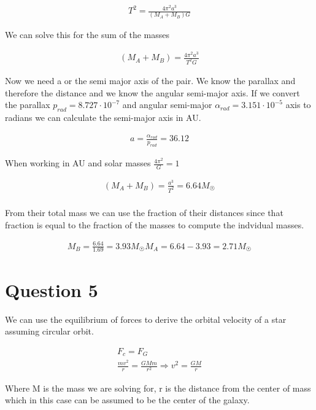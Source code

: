 \documentclass[a4paper]{article}
\begin{document}
\begin{align}
    T^2 = \frac{4\pi^2a^3}{(M_A+M_B)G}
\end{align}

We can solve this for the sum of the masses

\begin{align}
    (M_A+M_B) = \frac{4\pi^2a^3}{T^2G}
\end{align}

Now we need a or the semi major axis of the pair. We know the parallax and therefore the distance and we know the angular semi-major axis. If we convert the parallax $p_{rad} = 8.727 \cdot 10^{-7}$ and angular semi-major $\alpha_{rad} = 3.151 \cdot 10^{-5}$ axis to radians we can calculate the semi-major axis in AU.

\begin{align}
    a = \frac{\alpha_{rad}}{p_{rad}} =  36.12
\end{align}

When working in AU and solar masses $\frac{4\pi^2}{G} = 1$

\begin{align}
    (M_A+M_B) = \frac{a^3}{T^2} = 6.64 M_{\Sun} \\ 
\end{align}

From their total mass we can use the fraction of their distances since that fraction is equal to the fraction of the masses to compute the indvidual masses. 

\begin{align}
    M_B = \frac{6.64}{1.69} = 3.93 M_{\Sun}
    M_A = 6.64 - 3.93 = 2.71 M_{\Sun}
\end{align}

\section*{Question 5}

We can use the equilibrium of forces to derive the orbital velocity of a star assuming circular orbit.

\begin{align}
    F_c = F_G \\
    \frac{mv^2}{r} = \frac{GMm}{r^2} \Rightarrow v^2 = \frac{GM}{r}
\end{align}

Where M is the mass we are solving for, r is the distance from the center of mass which in this case can be assumed to be the center of the galaxy. 
\end{document}
